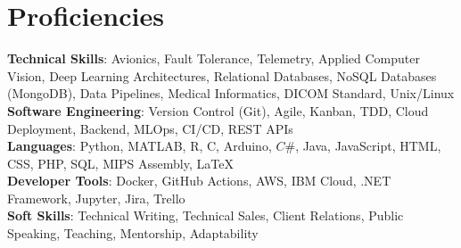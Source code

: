 \documentclass[letterpaper,10pt]{article}
\def\proficiencySpace{3pt}
\begin{document}
\section{Proficiencies}
\vspace{2pt}
 \begin{itemize}[leftmargin=0.15in, label={}]
    \small{\item{
     \textbf{Technical Skills}{: Avionics, Fault Tolerance, Telemetry, Applied Computer Vision, Deep Learning Architectures, Relational Databases, NoSQL Databases (MongoDB), Data Pipelines, Medical Informatics, DICOM Standard, Unix/Linux} \vspace{\proficiencySpace} \\ 
     \textbf{Software Engineering}{: Version Control (Git), Agile, Kanban, TDD, Cloud Deployment, Backend, MLOps, CI/CD, REST APIs} \vspace{\proficiencySpace} \\ 
     \textbf{Languages}{: Python, MATLAB, R, C, Arduino, $C\#$, Java, JavaScript, HTML, CSS, PHP, SQL, MIPS Assembly, LaTeX} \vspace{\proficiencySpace} \\
     \textbf{Developer Tools}{: Docker, GitHub Actions, AWS, IBM Cloud, .NET Framework, Jupyter, Jira, Trello} \vspace{\proficiencySpace} \\
     \textbf{Soft Skills}{: Technical Writing, Technical Sales, Client Relations, Public Speaking, Teaching, Mentorship, Adaptability}
    }}
 \end{itemize}
\end{document}
